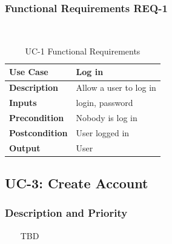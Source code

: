 \documentclass{report}
\begin{document}
\subsubsection*{Functional Requirements REQ-1} ~~~
\begin{table}[H]
	\begin{center}
		\begin{tabular}{|m{4cm}|m{10cm}|}
		\hline
		\textbf{Use Case} & Log in \\
		\hline
		\textbf{Description} & Allow a user to log in  \\
		\hline
		\textbf{Inputs} & login, password \\
		\hline
		\textbf{Precondition} & Nobody is log in  \\
		\hline
		\textbf{Postcondition} & User logged in \\
		\hline
		\textbf{Output} & User \\
		\hline
		\end{tabular}
	\end{center}
	\caption{UC-1 Functional Requirements}
	\label{table:REQ-1}
\end{table}





\subsection{UC-3: Create Account}

\subsubsection*{Description and Priority} ~~~
TBD
\end{document}
